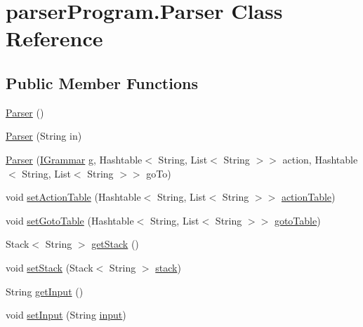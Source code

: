 \hypertarget{classparser_program_1_1_parser}{\section{parser\-Program.\-Parser Class Reference}
\label{classparser_program_1_1_parser}
}
\subsection*{Public Member Functions}
\begin{DoxyCompactItemize}
\item 
\hyperlink{classparser_program_1_1_parser_a9c62c824a5995e1097cc0883f8063bee}{Parser} ()
\item 
\hyperlink{classparser_program_1_1_parser_a5644d6222c7361fdb65c5ea16dd90b83}{Parser} (String in)
\item 
\hyperlink{classparser_program_1_1_parser_a4d849aad507c9e18cc30c62ba6204d0d}{Parser} (\hyperlink{interfacecontext_free_1_1grammar_1_1_i_grammar}{I\-Grammar} g, Hashtable$<$ String, List$<$ String $>$$>$ action, Hashtable$<$ String, List$<$ String $>$$>$ go\-To)
\item 
void \hyperlink{classparser_program_1_1_parser_a4c6568b8fe03468e34af986b75ee7738}{set\-Action\-Table} (Hashtable$<$ String, List$<$ String $>$$>$ \hyperlink{classparser_program_1_1_parser_a42745877538a8470054f0714ca6c082f}{action\-Table})
\item 
void \hyperlink{classparser_program_1_1_parser_ae163ace9e4ba81f5f22141a3603d2395}{set\-Goto\-Table} (Hashtable$<$ String, List$<$ String $>$$>$ \hyperlink{classparser_program_1_1_parser_a1948270f44bb481bea3b69ef63483f5e}{goto\-Table})
\item 
Stack$<$ String $>$ \hyperlink{classparser_program_1_1_parser_a1b487b0da772e226bb5c63f4f8b6cc16}{get\-Stack} ()
\item 
void \hyperlink{classparser_program_1_1_parser_a2b0107ab4f177b2e568eab766e58a436}{set\-Stack} (Stack$<$ String $>$ \hyperlink{classparser_program_1_1_parser_aba60a83700b302e63b4467f15d5039b0}{stack})
\item 
String \hyperlink{classparser_program_1_1_parser_acda1496f2f1050294369019df45f00c0}{get\-Input} ()
\item 
void \hyperlink{classparser_program_1_1_parser_a46fb30b4d629ed1962f1f055d342e6ef}{set\-Input} (String \hyperlink{classparser_program_1_1_parser_ac728347af517d44c609290f2b56cda49}{input})
\item 

\end{DoxyCompactItemize}
